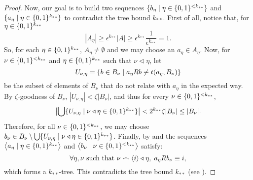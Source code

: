 \begin{lemma}
\begin{proof}
                Now, our goal is to build two sequences $\{ b_\eta \mid \eta \in \{ 0,1 \}^{<k_{**}} \}$ and
                $\{ a_\eta \mid \eta \in \{ 0,1 \}^{k_{**}} \}$ to contradict the tree bound $k_{**}$.
                First of all, notice that, for $\eta \in \{ 0,1 \}^{k_{**}}$
                \[
                    |A_\eta| \geq \epsilon^{k_{**}} |A| \geq
                    \epsilon^{k_{**}} \frac{1}{\epsilon^{k_{**}}} = 1.
                \]
                So, for each $\eta \in \{ 0,1 \}^{k_{**}}$, $A_\eta \neq \emptyset$ and we may choose an $a_\eta \in A_\eta$.
                Now, for $\nu \in \{ 0,1 \}^{<k_{**}}$ and $\eta \in \{ 0,1 \}^{k_{**}}$ such that $\nu \triangleleft \eta$, let
                \[
                    U_{\nu,\eta} = \{ b \in B_\nu \mid a_\eta R b \not\equiv t(a_\eta, B_\nu) \}
                \]
                be the subset of elements of $B_\nu$ that do not relate with $a_\eta$ in the expected way.
                By $\zeta$-goodness of $B_\nu$, $|U_{\nu, \eta}| < \zeta |B_\nu|$, and thus for every $\nu \in \{ 0,1 \}^{<k_{**}}$,
                \[
                    \bigl| \bigcup\{  U_{\nu,\eta} \mid \nu \triangleleft \eta \in \{ 0,1 \}^{k_{**}} \} \bigr| <
                    2^{k_{**}} \zeta |B_\nu| \leq |B_\nu|.
                \]
                Therefore, for all $\nu \in \{ 0,1 \}^{<k_{**}}$, we may choose
                $b_\nu \in B_\nu \setminus \bigcup\{ U_{\nu,\eta} \mid \nu \triangleleft \eta \in \{ 0,1 \}^{k_{**}} \}$.
                Finally, by  and 
                the sequences $\left< a_\eta \mid \eta \in \{ 0,1 \}^{k_{**}} \right>$ and $\left< b_\nu \mid \nu \in \{ 0,1 \}^{<k_{**}} \right>$
                satisfy:
                \[
                    \forall \eta, \nu \text{ such that } \nu \frown \left< i \right> \triangleleft \eta, \; a_\eta R b_\nu \equiv i,
                \]
                which forms a $k_{**}$-tree.
                This contradicts the tree bound $k_{**}$ (see ).
            \end{proof}
        \end{lemma}

